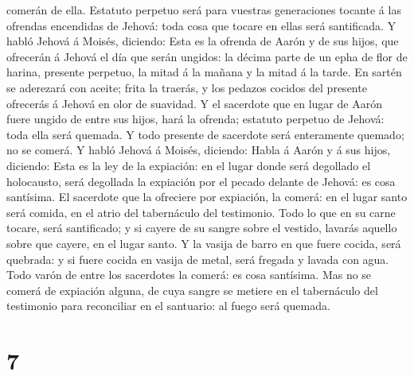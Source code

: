 comerán de ella. Estatuto perpetuo será para vuestras generaciones
tocante á las ofrendas encendidas de Jehová: toda cosa que tocare en
ellas será santificada.  Y habló Jehová á Moisés, diciendo:
 Esta es la ofrenda de Aarón y de sus hijos, que ofrecerán
á Jehová el día que serán ungidos: la décima parte de un epha de flor de
harina, presente perpetuo, la mitad á la mañana y la mitad á la tarde.
 En sartén se aderezará con aceite; frita la traerás, y los
pedazos cocidos del presente ofrecerás á Jehová en olor de suavidad.
 Y el sacerdote que en lugar de Aarón fuere ungido de entre
sus hijos, hará la ofrenda; estatuto perpetuo de Jehová: toda ella será
quemada.  Y todo presente de sacerdote será enteramente
quemado; no se comerá.  Y habló Jehová á Moisés, diciendo:
 Habla á Aarón y á sus hijos, diciendo: Esta es la ley de
la expiación: en el lugar donde será degollado el holocausto, será
degollada la expiación por el pecado delante de Jehová: es cosa
santísima.  El sacerdote que la ofreciere por expiación, la
comerá: en el lugar santo será comida, en el atrio del tabernáculo del
testimonio.  Todo lo que en su carne tocare, será
santificado; y si cayere de su sangre sobre el vestido, lavarás aquello
sobre que cayere, en el lugar santo.  Y la vasija de barro
en que fuere cocida, será quebrada: y si fuere cocida en vasija de
metal, será fregada y lavada con agua.  Todo varón de entre
los sacerdotes la comerá: es cosa santísima.  Mas no se
comerá de expiación alguna, de cuya sangre se metiere en el tabernáculo
del testimonio para reconciliar en el santuario: al fuego será quemada.

\hypertarget{section-6}{%
\section{7}\label{section-6}}

